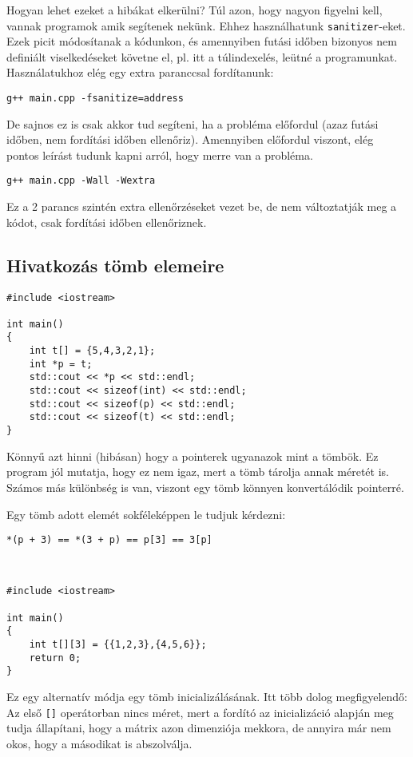 \documentclass[a4paper,11.5pt,table]{article}
\begin{document}
		Hogyan lehet ezeket a hibákat elkerülni? Túl azon, hogy nagyon figyelni kell, vannak programok amik segítenek nekünk. Ehhez használhatunk \texttt{sanitizer}-eket. Ezek picit módosítanak a kódunkon, és amennyiben futási időben bizonyos nem definiált viselkedéseket követne el, pl. itt a túlindexelés, leütné a programunkat. Használatukhoz elég egy extra paranccsal fordítanunk:
		
		{\centering\texttt{g++ main.cpp -fsanitize=address}\par }
		
		De sajnos ez is csak akkor tud segíteni, ha a probléma előfordul (azaz futási időben, nem fordítási időben ellenőriz). Amennyiben előfordul viszont, elég pontos leírást tudunk kapni arról, hogy merre van a probléma.
		
		{\centering \texttt{g++ main.cpp -Wall -Wextra} \par}
		
		Ez a 2 parancs szintén extra ellenőrzéseket vezet be, de nem változtatják meg a kódot, csak fordítási időben ellenőriznek.
	\subsection{Hivatkozás tömb elemeire}
		\begin{lstlisting}
#include <iostream>

int main()
{
	int t[] = {5,4,3,2,1};
	int *p = t;
	std::cout << *p << std::endl;
	std::cout << sizeof(int) << std::endl;
	std::cout << sizeof(p) << std::endl;
	std::cout << sizeof(t) << std::endl;
}
		\end{lstlisting}
		Könnyű azt hinni (hibásan) hogy a pointerek ugyanazok mint a tömbök. Ez  program jól mutatja, hogy ez nem igaz, mert a tömb tárolja annak méretét is. Számos más különbség is van, viszont egy tömb könnyen konvertálódik pointerré.
		
		Egy tömb adott elemét sokféleképpen le tudjuk kérdezni:
		
		{\centering \texttt{*(p + 3) == *(3 + p) == p[3] == 3[p]} \par}
		\
		\begin{lstlisting}
#include <iostream>

int main()
{
	int t[][3] = {{1,2,3},{4,5,6}};
	return 0;
}
		\end{lstlisting}
		Ez egy alternatív módja egy tömb inicializálásának. Itt több dolog megfigyelendő: Az első \texttt{[]} operátorban nincs méret, mert a fordító az inicializáció alapján meg tudja állapítani, hogy a mátrix azon dimenziója mekkora, de annyira már nem okos, hogy a másodikat is abszolválja.
		
\end{document}
